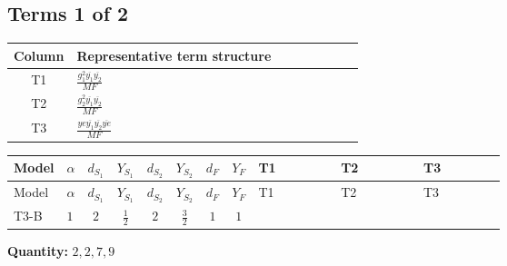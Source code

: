 \documentclass[8pt]{article}
\begin{document}
\begin{landscape}
\subsection*{Terms 1 of 2}
\begin{center}
\begin{tabular}{@{}c >{\raggedright\arraybackslash}p{0.82\linewidth}@{}}
\toprule
Column & Representative term structure \\
\midrule
T1 & \(\displaystyle \frac{g_{1}^{2} \overline{y_{1}} \overline{y_{2}}}{MF}\) \\
\midrule
T2 & \(\displaystyle \frac{g_{2}^{2} \overline{y_{1}} \overline{y_{2}}}{MF}\) \\
\midrule
T3 & \(\displaystyle \frac{ye \overline{y_{1}} \overline{y_{2}} \overline{ye}}{MF}\) \\
\midrule
\bottomrule
\end{tabular}
\end{center}
\smallskip
\tiny
\begin{longtable}{@{}llcccccc >{\raggedright\arraybackslash}p{0.21\linewidth} >{\raggedright\arraybackslash}p{0.21\linewidth} >{\raggedright\arraybackslash}p{0.21\linewidth}@{}}
\toprule
Model & $\alpha$ & $d_{S_1}$ & $Y_{S_1}$ & $d_{S_2}$ & $Y_{S_2}$ & $d_F$ & $Y_F$ & T1 & T2 & T3 \\
\midrule
\endfirsthead
\toprule
Model & $\alpha$ & $d_{S_1}$ & $Y_{S_1}$ & $d_{S_2}$ & $Y_{S_2}$ & $d_F$ & $Y_F$ & T1 & T2 & T3 \\
\midrule
\endhead
T3-B & $1$ & $2$ & $\frac{1}{2}$ & $2$ & $\frac{3}{2}$ & $1$ & $1$ & \scriptsize\adjustbox{max width=\linewidth}{$\begin{gathered} \frac{3 g_{1}^{2} \overline{y_{1}} \overline{y_{2}}}{2 MF}\end{gathered}$} & \scriptsize\adjustbox{max width=\linewidth}{$\begin{gathered} \frac{3 g_{2}^{2} \overline{y_{1}} \overline{y_{2}}}{4 MF}\end{gathered}$} & \scriptsize\adjustbox{max width=\linewidth}{$\begin{gathered} - \frac{ye \overline{y_{1}} \overline{y_{2}} \overline{ye}}{4 MF}\end{gathered}$} \\
\midrule
\bottomrule
\end{longtable}
\clearpage
\noindent\textbf{Quantity: }$\mathrm{2,2,7,9}$\par\smallskip

\end{landscape}
\end{document}
